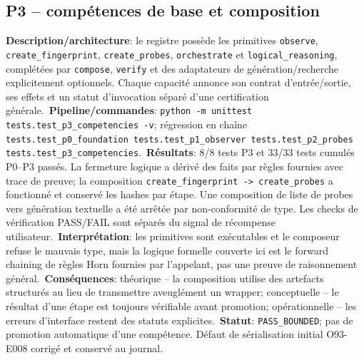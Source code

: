 \documentclass[11pt,a4paper,oneside]{report}
\begin{document}
\subsection{P3 -- compétences de base et composition}
\textbf{Description/architecture}: le registre possède les primitives \texttt{observe}, \texttt{create\_fingerprint}, \texttt{create\_probes}, \texttt{orchestrate} et \texttt{logical\_reasoning}, complétées par \texttt{compose}, \texttt{verify} et des adaptateurs de génération/recherche explicitement optionnels. Chaque capacité annonce son contrat d'entrée/sortie, ses effets et un statut d'invocation séparé d'une certification générale.\
\textbf{Pipeline/commandes}: \texttt{python -m unittest tests.test\_p3\_competencies -v}; régression en chaîne \texttt{tests.test\_p0\_foundation tests.test\_p1\_observer tests.test\_p2\_probes tests.test\_p3\_competencies}.\
\textbf{Résultats}: 8/8 tests P3 et 33/33 tests cumulés P0--P3 passés. La fermeture logique a dérivé des faits par règles fournies avec trace de preuve; la composition \texttt{create\_fingerprint -> create\_probes} a fonctionné et conservé les hashes par étape. Une composition de liste de probes vers génération textuelle a été arrêtée par non-conformité de type. Les checks de vérification PASS/FAIL sont séparés du signal de récompense utilisateur.\
\textbf{Interprétation}: les primitives sont exécutables et le composeur refuse le mauvais type, mais la logique formelle couverte ici est le forward chaining de règles Horn fournies par l'appelant, pas une preuve de raisonnement général.\
\textbf{Conséquences}: théorique -- la composition utilise des artefacts structurés au lieu de transmettre aveuglément un wrapper; conceptuelle -- le résultat d'une étape est toujours vérifiable avant promotion; opérationnelle -- les erreurs d'interface restent des statuts explicites.\
\textbf{Statut}: \texttt{PASS\_BOUNDED}; pas de promotion automatique d'une compétence. Défaut de sérialisation initial O93-E008 corrigé et conservé au journal.\
\end{document}
